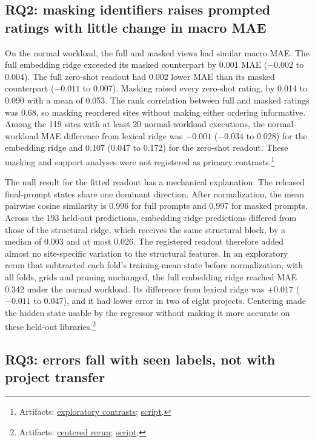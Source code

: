 \documentclass[11pt]{article}
\newcommand{\repocommit}{81d03caebe268d013b3163bcbff31cadabaaec21}
\newcommand{\repourl}{https://github.com/minggu151623/llm_profiling_research}
\newcommand{\repo}[2]{\href{\repourl/blob/\repocommit/#1}{#2}}
\newcommand{\artifacts}[1]{\footnote{Artifacts: #1.}}
\begin{document}
\subsection{RQ2: masking identifiers raises prompted ratings with little change in macro MAE}

On the normal workload, the full and masked views had similar macro MAE. The full embedding ridge exceeded its masked counterpart by 0.001 MAE ($-0.002$ to 0.004). The full zero-shot readout had 0.002 lower MAE than its masked counterpart ($-0.011$ to 0.007). Masking raised every zero-shot rating, by 0.014 to 0.090 with a mean of 0.053. The rank correlation between full and masked ratings was 0.68, so masking reordered sites without making either ordering informative. Among the 119 sites with at least 20 normal-workload executions, the normal-workload MAE difference from lexical ridge was $-0.001$ ($-0.034$ to 0.028) for the embedding ridge and 0.107 (0.047 to 0.172) for the zero-shot readout. These masking and support analyses were not registered as primary contrasts.\artifacts{\repo{experiments/study/supplement/sensitivity.csv}{exploratory contrasts}; \repo{ml/sensitivity.py}{script}}

The null result for the fitted readout has a mechanical explanation. The released final-prompt states share one dominant direction. After normalization, the mean pairwise cosine similarity is 0.996 for full prompts and 0.997 for masked prompts. Across the 193 held-out predictions, embedding ridge predictions differed from those of the structural ridge, which receives the same structural block, by a median of 0.003 and at most 0.026. The registered readout therefore added almost no site-specific variation to the structural features. In an exploratory rerun that subtracted each fold's training-mean state before normalization, with all folds, grids and pruning unchanged, the full embedding ridge reached MAE 0.342 under the normal workload. Its difference from lexical ridge was $+0.017$ ($-0.011$ to 0.047), and it had lower error in two of eight projects. Centering made the hidden state usable by the regressor without making it more accurate on these held-out libraries.\artifacts{\repo{experiments/study/supplement/centered.csv}{centered rerun}; \repo{ml/centered.py}{script}}

\subsection{RQ3: errors fall with seen labels, not with project transfer}
\end{document}
